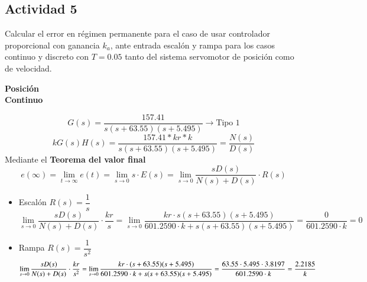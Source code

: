 \subsection{Actividad 5}
Calcular el error en régimen permanente para el caso de usar
controlador proporcional con ganancia $k_a$, ante entrada escalón y
rampa para los casos continuo y discreto con $T=0.05$ tanto del
sistema servomotor de posición como de velocidad.
\begin{center}
  {\Large\textbf{Posición}}\\
   \textbf{Continuo}
  \end{center}
\begin{equation}
  G(s) = \dfrac{157.41}{s(s+63.55)(s+5.495)} \rightarrow \text{Tipo 1}
\end{equation}
\begin{equation}
    kG(s)H(s) = \dfrac{157.41*kr*k}{s(s+63.55)(s+5.495)} =
  \dfrac{N(s)}{D(s)} 
\end{equation}
Mediante el \textbf{Teorema del valor final} 
\begin{equation}
  e(\infty) = \lim_{t\to\infty}e(t)=\lim_{s\to 0}s\cdot E(s)=
  \lim_{s\to 0}\dfrac{s D(s)}{N(s)+D(s)} \cdot R(s) 
\end{equation}
\begin{itemize}
\item Escalón $R(s) =\dfrac{1}{s}$
  \begin{equation}
    \lim_{s\to 0}\dfrac{s D(s)}{N(s)+D(s)} \cdot \dfrac{kr}{s} =
    \lim_{s\to 0}\dfrac{kr \cdot
      s(s+63.55)(s+5.495)}{601.2590\cdot k+s(s+63.55)(s+5.495)} =
    \dfrac{0}{601.2590\cdot k} = 0
    \end{equation}
  \item Rampa $R(s) = \dfrac{1}{s^2}$
    \begin{equation}
      \small
    \lim_{s\to 0}\dfrac{s D(s)}{N(s)+D(s)} \cdot \dfrac{kr}{s^2} =
    \lim_{s\to 0}\dfrac{kr \cdot
      (s+63.55)(s+5.495)}{601.2590\cdot k+s(s+63.55)(s+5.495)} =
    \dfrac{63.55\cdot5.495\cdot3.8197}{601.2590\cdot k} = \dfrac{2.2185}{k}
    \end{equation}
  \end{itemize}

